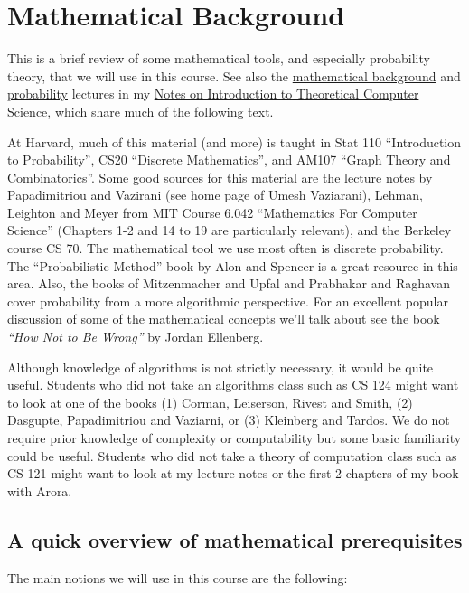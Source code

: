 \chapter{Mathematical Background}\label{0-Mathematical-Backgroun}

This is a brief review of some mathematical tools, and especially
probability theory, that we will use in this course. See also the
\href{http://www.introtcs.org/public/lec_00_1_math_background.html}{mathematical
background} and
\href{http://www.introtcs.org/public/lec_15_probability.html}{probability}
lectures in my \href{http://www.introtcs.org/}{Notes on Introduction to
Theoretical Computer Science}, which share much of the following text.

At Harvard, much of this material (and more) is taught in Stat 110
``Introduction to Probability'', CS20 ``Discrete Mathematics'', and
AM107 ``Graph Theory and Combinatorics''. Some good sources for this
material are the lecture notes by Papadimitriou and Vazirani (see home
page of Umesh Vaziarani), Lehman, Leighton and Meyer from MIT Course
6.042 ``Mathematics For Computer Science'' (Chapters 1-2 and 14 to 19
are particularly relevant), and the Berkeley course CS 70. The
mathematical tool we use most often is discrete probability. The
``Probabilistic Method'' book by Alon and Spencer is a great resource in
this area. Also, the books of Mitzenmacher and Upfal and Prabhakar and
Raghavan cover probability from a more algorithmic perspective. For an
excellent popular discussion of some of the mathematical concepts we'll
talk about see the book \emph{``How Not to Be Wrong''} by Jordan
Ellenberg.

Although knowledge of algorithms is not strictly necessary, it would be
quite useful. Students who did not take an algorithms class such as CS
124 might want to look at one of the books (1) Corman, Leiserson, Rivest
and Smith, (2) Dasgupte, Papadimitriou and Vaziarni, or (3) Kleinberg
and Tardos. We do not require prior knowledge of complexity or
computability but some basic familiarity could be useful. Students who
did not take a theory of computation class such as CS 121 might want to
look at my lecture notes or the first 2 chapters of my book with Arora.

\section{A quick overview of mathematical
prerequisites}\label{0-A-quick-overview-of-ma}

The main notions we will use in this course are the following:

